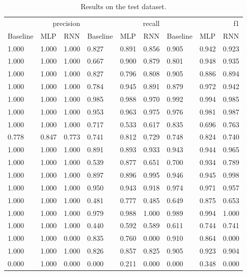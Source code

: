 \begin{table}
\caption{Results on the test dataset.}
\label{tab::ex_2_test}
\begin{tabular}{|l||l||l||l||l||l||l||l||l|}
\toprule
\multicolumn{3}{r}{precision} & \multicolumn{3}{r}{recall} & \multicolumn{3}{r}{f1} \\
Baseline & MLP & RNN & Baseline & MLP & RNN & Baseline & MLP & RNN \\
\midrule
1.000 & 1.000 & 1.000 & 0.827 & 0.891 & 0.856 & 0.905 & 0.942 & 0.923 \\
1.000 & 1.000 & 1.000 & 0.667 & 0.900 & 0.879 & 0.801 & 0.948 & 0.935 \\
1.000 & 1.000 & 1.000 & 0.827 & 0.796 & 0.808 & 0.905 & 0.886 & 0.894 \\
1.000 & 1.000 & 1.000 & 0.784 & 0.945 & 0.891 & 0.879 & 0.972 & 0.942 \\
1.000 & 1.000 & 1.000 & 0.985 & 0.988 & 0.970 & 0.992 & 0.994 & 0.985 \\
1.000 & 1.000 & 1.000 & 0.953 & 0.963 & 0.975 & 0.976 & 0.981 & 0.987 \\
1.000 & 1.000 & 1.000 & 0.717 & 0.533 & 0.617 & 0.835 & 0.696 & 0.763 \\
0.778 & 0.847 & 0.773 & 0.741 & 0.812 & 0.729 & 0.748 & 0.824 & 0.740 \\
1.000 & 1.000 & 1.000 & 0.891 & 0.893 & 0.933 & 0.943 & 0.944 & 0.965 \\
1.000 & 1.000 & 1.000 & 0.539 & 0.877 & 0.651 & 0.700 & 0.934 & 0.789 \\
1.000 & 1.000 & 1.000 & 0.897 & 0.896 & 0.995 & 0.946 & 0.945 & 0.998 \\
1.000 & 1.000 & 1.000 & 0.950 & 0.943 & 0.918 & 0.974 & 0.971 & 0.957 \\
1.000 & 1.000 & 1.000 & 0.481 & 0.777 & 0.485 & 0.649 & 0.875 & 0.653 \\
1.000 & 1.000 & 1.000 & 0.979 & 0.988 & 1.000 & 0.989 & 0.994 & 1.000 \\
1.000 & 1.000 & 1.000 & 0.440 & 0.592 & 0.589 & 0.611 & 0.744 & 0.741 \\
1.000 & 1.000 & 0.000 & 0.835 & 0.760 & 0.000 & 0.910 & 0.864 & 0.000 \\
1.000 & 1.000 & 1.000 & 0.826 & 0.857 & 0.825 & 0.905 & 0.923 & 0.904 \\
0.000 & 1.000 & 0.000 & 0.000 & 0.211 & 0.000 & 0.000 & 0.348 & 0.000 \\
\bottomrule
\end{tabular}
\end{table}
